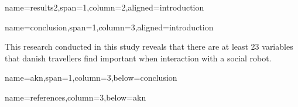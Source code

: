 \documentclass[paperwidth=160cm,paperheight=100cm,landscape,fontscale=0.3010]{baposter}
\begin{document}
\begin{poster}
{name=results2,span=1,column=2,aligned=introduction}
{\parskip 5pt


}


{name=conclusion,span=1,column=3,aligned=introduction}
{\parskip 5pt
This research conducted in this study reveals that there are at least 23 variables that danish travellers find important when interaction with a social robot. 


}


{name=akn,span=1,column=3,below=conclusion}
{\parskip 5pt

}


{name=references,column=3,below=akn}
{
\renewcommand{\section}[2]{}%
\footnotesize
}



\end{poster}
\end{document}
